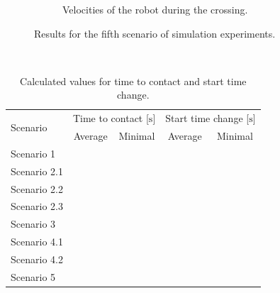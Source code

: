 \begin{figure}[H]
\begin{subfigure}{0.49\linewidth}
                    \caption{Velocities of the robot during the crossing.}
                    \label{fig:scene5_vel}
                \end{subfigure}
                \caption{Results for the fifth scenario of simulation experiments.}
                \label{fig:scene5_graphs}
            \end{figure}
        \\
            \begin{table}[H]
                \centering
                \begin{tabular}{|l|c c|c c|}
                    \hline
                    \multirow{2}{4em}{Scenario} & \multicolumn{2}{c|}{Time to contact [$\si{\s}$]} & \multicolumn{2}{c|}{Start time change [$\si{\s}$]}\\
                    & Average & Minimal & Average & Minimal\\
                    \hline\hline
                    Scenario 1 & & & & \\
                    \hline
                    Scenario 2.1 & & & & \\
                    \hline
                    Scenario 2.2 & & & & \\
                    \hline
                    Scenario 2.3 & & & & \\
                    \hline
                    Scenario 3 & & & & \\
                    \hline
                    Scenario 4.1 & & & & \\
                    \hline
                    Scenario 4.2 & & & & \\
                    \hline
                    Scenario 5 & & & & \\
                    \hline
                \end{tabular}
                \caption{Calculated values for time to contact and start time change.}
            \end{table}
